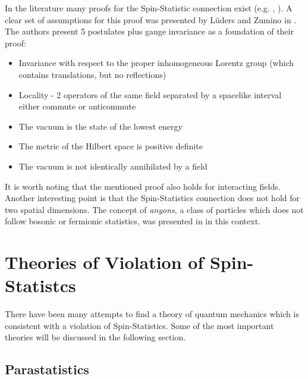 In the literature many proofs for the Spin-Statistic connection exist (e.g. \cite{Pauli1940}, \cite{Schwinger1958}). A clear set of assumptions for this proof was presented by Lüders and Zumino in \cite{Luders1958}. The authors present 5 postulates plus gauge invariance as a foundation of their proof:
\begin{itemize}
 \item Invariance with respect to the proper inhomogeneous Lorentz group (which contains translations, but no reflections)
 \item Locality - 2 operators of the same field separated by a spacelike interval either commute or anticommute
 \item The vacuum is the state of the lowest energy
 \item The metric of the Hilbert space is positive definite
 \item The vacuum is not identically annihilated by a field
\end{itemize}
It is worth noting that the mentioned proof also holds for interacting fields. Another interesting point is that the Spin-Statistics connection does not hold for two spatial dimensions. The concept of \textit{anyons}, a class of particles which does not follow bosonic or fermionic statistics, was presented in \cite{Stern2008} in this context.

\section{Theories of Violation of Spin-Statistcs}
\label{sec:thVioPEP}

There have been many attempts to find a theory of quantum mechanics which is consistent with a violation of Spin-Statistics. Some of the most important theories will be discussed in the following section.

\subsection{Parastatistics}

